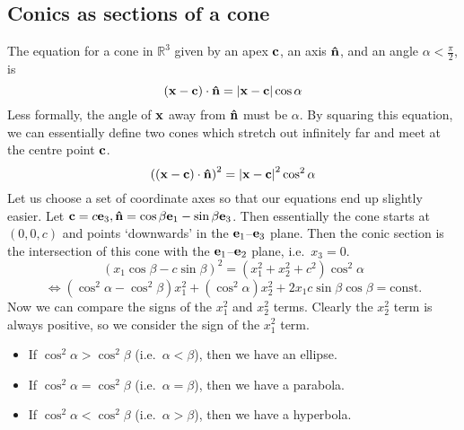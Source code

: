 \subsection{Conics as sections of a cone}
The equation for a cone in \(\mathbb R^3\) given by an apex \(\vb c\), an axis \(\vu{n}\), and an angle \(\alpha < \frac{\pi}{2}\), is
\[
	(\vb x - \vb c)\cdot\vu{n} = \abs{\vb x - \vb c}\cos \alpha
\]
Less formally, the angle of \(\vb x\) away from \(\vu{n}\) must be \(\alpha\).
By squaring this equation, we can essentially define two cones which stretch out infinitely far and meet at the centre point \(\vb c\).
\[
	\left( (\vb x - \vb c)\cdot\vu{n} \right)^2 = \abs{\vb x - \vb c}^2\cos^2 \alpha
\]
Let us choose a set of coordinate axes so that our equations end up slightly easier.
Let \(\vb c = c\vb e_3, \vu{n} = \cos\beta \vb e_1 - \sin\beta \vb e_3\).
Then essentially the cone starts at \((0, 0, c)\) and points `downwards' in the \(\vb e_1\)--\(\vb e_3\) plane.
Then the conic section is the intersection of this cone with the \(\vb e_1\)--\(\vb e_2\) plane, i.e.\ \(x_3 = 0\).
\[
	(x_1\cos\beta - c\sin\beta)^2 = (x_1^2 + x_2^2 + c^2)\cos^2\alpha
\]
\[
	\iff (\cos^2\alpha - \cos^2\beta)x_1^2 + (\cos^2\alpha)x_2^2 + 2x_1c\sin\beta\cos\beta = \text{const.}
\]
Now we can compare the signs of the \(x_1^2\) and \(x_2^2\) terms.
Clearly the \(x_2^2\) term is always positive, so we consider the sign of the \(x_1^2\) term.
\begin{itemize}
	\item If \(\cos^2 \alpha > \cos^2\beta\) (i.e.\ \(\alpha < \beta\)), then we have an ellipse.
	\item If \(\cos^2 \alpha = \cos^2\beta\) (i.e.\ \(\alpha = \beta\)), then we have a parabola.
	\item If \(\cos^2 \alpha < \cos^2\beta\) (i.e.\ \(\alpha > \beta\)), then we have a hyperbola.
\end{itemize}
